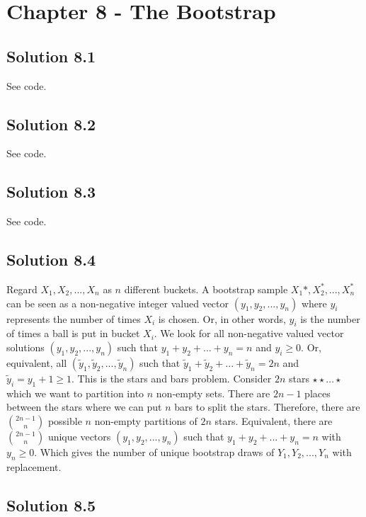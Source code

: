 \section*{Chapter 8 - The Bootstrap}

\subsection*{Solution 8.1}

See code.


\subsection*{Solution 8.2}

See code.


\subsection*{Solution 8.3}

See code.


\subsection*{Solution 8.4}

Regard $X_1, X_2, ..., X_n$ as $n$ different buckets.
A bootstrap sample $X_1*, X_2^*, ..., X_n^*$ can be seen as a non-negative integer valued vector $(y_1, y_2, ..., y_n)$ where $y_i$ represents the number of times $X_i$ is chosen.
Or, in other words, $y_i$ is the number of times a ball is put in bucket $X_i$.
We look for all non-negative valued vector solutions $(y_1, y_2, ..., y_n)$ such that $y_1 + y_2 + ... + y_n = n$ and $y_i \geq 0$.
Or, equivalent, all $(\tilde{y}_1, \tilde{y}_2, ..., \tilde{y}_n)$ such that $\tilde{y}_1 + \tilde{y}_2 + ... + \tilde{y}_n = 2n$ and $\tilde{y}_i = y_1 + 1 \geq 1$.
This is the stars and bars problem.
Consider $2n$ stars $\star \star \ldots \star$ which we want to partition into $n$ non-empty sets.
There are $2n - 1$ places between the stars where we can put $n$ bars to split the stars.
Therefore, there are $\binom{2n - 1}{n}$ possible $n$ non-empty partitions of $2n$ stars.
Equivalent, there are $\binom{2n - 1}{n}$ unique vectors $(y_1, y_2, ..., y_n)$ such that $y_1 + y_2 + ... + y_n = n$ with $y_n \geq 0$.
Which gives the number of unique bootstrap draws of $Y_1, Y_2, ..., Y_n$ with replacement.


\subsection*{Solution 8.5}

